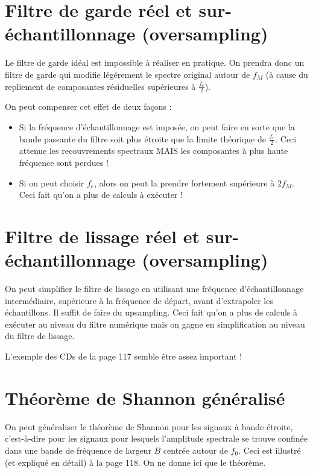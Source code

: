     \section{Filtre de garde réel et sur-échantillonnage (oversampling)}
        Le filtre de garde idéal est impossible à réaliser en pratique. On prendra donc un filtre de garde qui modifie légérement le spectre original autour de $f_M$ (à cause du repliement de composantes résiduelles supérieures à $\frac{f_e}{2}$).

        On peut compenser cet effet de deux façons :
        \begin{itemize}
            \item Si la fréquence d'échantillonnage est imposée, on peut faire en sorte que la bande passante du filtre soit plus étroite que la limite théorique de $\frac{f_e}{2}$. Ceci attenue les recouvrements spectraux MAIS les composantes à plus haute fréquence sont perdues !
            \item Si on peut choisir $f_e$, alors on peut la prendre fortement supérieure à $2f_M$. Ceci fait qu'on a plus de calculs à exécuter !
        \end{itemize}

    \section{Filtre de lissage réel et sur-échantillonnage (oversampling)}
        On peut simplifier le filtre de lissage en utilisant une fréquence d'échantillonnage intermédiaire, supérieure à la fréquence de départ, avant d'extrapoler les échantillons. Il suffit de faire du upsampling. Ceci fait qu'on a plus de calculs à exécuter au niveau du filtre numérique mais on gagne en simplification au niveau du filtre de lissage.

        \begin{exemple}
            L'exemple des CDs de la page 117 semble être assez important !
        \end{exemple}

    \section{Théorème de Shannon généralisé}
        On peut généraliser le théorème de Shannon pour les signaux à bande étroite, c'est-à-dire pour les signaux pour lesquels l'amplitude spectrale se trouve confinée dans une bande de fréquence de largeur $B$ centrée autour de $f_0$. Ceci est illustré (et expliqué en détail) à la page 118. On ne donne ici que le théorème.

